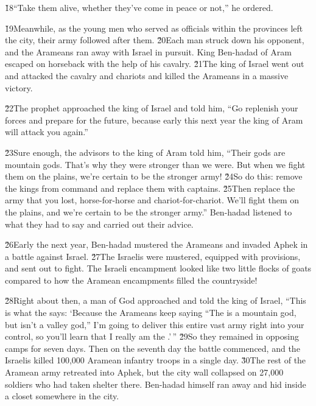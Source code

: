 \v{18}``Take them alive, whether they've come in peace or not,'' he ordered.

\v{19}Meanwhile, as the young men who served as officials within the provinces left the city, their army followed after them. \v{20}Each man struck down his opponent, and the Arameans ran away with Israel in pursuit. King Ben-hadad of Aram escaped on horseback with the help of his cavalry. \v{21}The king of Israel went out and attacked the cavalry and chariots and killed the Arameans in a massive victory.

\v{22}The prophet approached the king of Israel and told him, ``Go replenish your forces and prepare for the future, because early this next year the king of Aram will attack you again.''

\v{23}Sure enough, the advisors to the king of Aram told him, ``Their gods are mountain gods. That's why they were stronger than we were. But when we fight them on the plains, we're certain to be the stronger army! \v{24}So do this: remove the kings from command and replace them with captains. \v{25}Then replace the army that you lost, horse-for-horse and chariot-for-chariot. We'll fight them on the plains, and we're certain to be the stronger army.'' Ben-hadad listened to what they had to say and carried out their advice.

\v{26}Early the next year, Ben-hadad mustered the Arameans and invaded Aphek in a battle against Israel. \v{27}The Israelis were mustered, equipped with provisions, and sent out to fight. The Israeli encampment looked like two little flocks of goats compared to how the Aramean encampments filled the countryside!

\v{28}Right about then, a man of God approached and told the king of Israel, ``This is what the  says: `Because the Arameans keep saying ``The  is a mountain god, but isn't a valley god,'' I'm going to deliver this entire vast army right into your control, so you'll learn that I really am the .'\,'' \v{29}So they remained in opposing camps for seven days. Then on the seventh day the battle commenced, and the Israelis killed 100,000 Aramean infantry troops in a single day. \v{30}The rest of the Aramean army retreated into Aphek, but the city wall collapsed on 27,000 soldiers who had taken shelter there. Ben-hadad himself ran away and hid inside a closet somewhere in the city.

